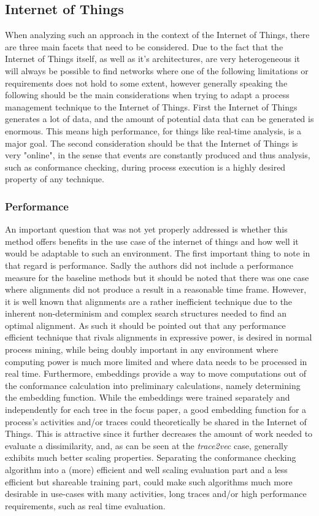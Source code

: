 \documentclass[runningheads]{template/llncs}
\begin{document}
\subsection{Internet of Things}
When analyzing such an approach in the context of the Internet of Things, there are three main facets that need to be considered.
Due to the fact that the Internet of Things itself, as well as it's architectures, are very heterogeneous it will always be possible to find networks where one of the following limitations or requirements does not hold to some extent, however generally speaking the following should be the main considerations when trying to adapt a process management technique to the Internet of Things.
First the Internet of Things generates a lot of data, and the amount of potential data that can be generated is enormous.
This means high performance, for things like real-time analysis, is a major goal.
The second consideration should be that the Internet of Things is very "online", in the sense that events are constantly produced and thus analysis, such as conformance checking, during process execution is a highly desired property of any technique. 

\subsubsection{Performance}
An important question that was not yet properly addressed is whether this method offers benefits in the use case of the internet of things and how well it would be adaptable to such an environment.
The first important thing to note in that regard is performance.
Sadly the authors did not include a performance measure for the baseline methods but it should be noted that there was one case where alignments did not produce a result in a reasonable time frame. 
However, it is well known that alignments are a rather inefficient technique due to the inherent non-determinism and complex search structures needed to find an optimal alignment.
As such it should be pointed out that any performance efficient technique that rivals alignments in expressive power, is desired in normal process mining, while being doubly important in any environment where computing power is much more limited and where data needs to be processed in real time.
Furthermore, embeddings provide a way to move computations out of the conformance calculation into preliminary calculations, namely determining the embedding function.
While the embeddings were trained separately and independently for each tree in the focus paper, a good embedding function for a process's activities and/or traces could theoretically be shared in the Internet of Things.
This is attractive since it further decreases the amount of work needed to evaluate a dissimilarity, and, as can be seen at the \emph{trace2vec} case, generally exhibits much better scaling properties.
Separating the conformance checking algorithm into a (more) efficient and well scaling evaluation part and a less efficient but shareable training part, could make such algorithms much more desirable in use-cases with many activities, long traces and/or high performance requirements, such as real time evaluation.
\end{document}
